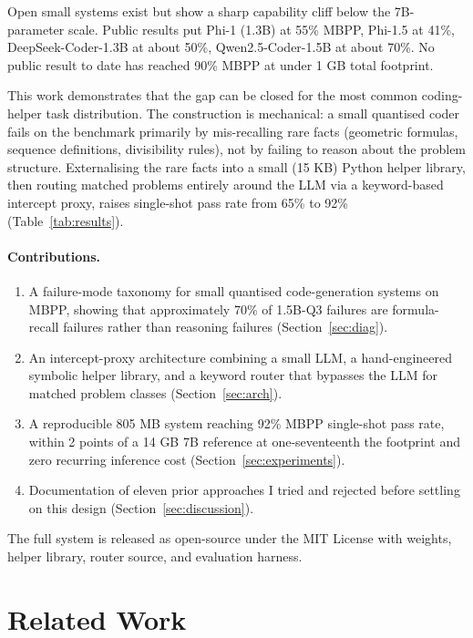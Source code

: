 \documentclass[11pt,a4paper]{article}
\begin{document}
Open small systems exist but show a sharp capability cliff below the 7B-parameter scale. Public results put Phi-1 (1.3B) at 55\% MBPP, Phi-1.5 at 41\%, DeepSeek-Coder-1.3B at about 50\%, Qwen2.5-Coder-1.5B at about 70\%. No public result to date has reached 90\% MBPP at under 1 GB total footprint.

This work demonstrates that the gap can be closed for the most common coding-helper task distribution. The construction is mechanical: a small quantised coder fails on the benchmark primarily by mis-recalling rare facts (geometric formulas, sequence definitions, divisibility rules), not by failing to reason about the problem structure. Externalising the rare facts into a small (15 KB) Python helper library, then routing matched problems entirely around the LLM via a keyword-based intercept proxy, raises single-shot pass rate from 65\% to 92\% (Table~\ref{tab:results}).

\paragraph{Contributions.}
\begin{enumerate}
\item A failure-mode taxonomy for small quantised code-generation systems on MBPP, showing that approximately 70\% of 1.5B-Q3 failures are formula-recall failures rather than reasoning failures (Section~\ref{sec:diag}).
\item An intercept-proxy architecture combining a small LLM, a hand-engineered symbolic helper library, and a keyword router that bypasses the LLM for matched problem classes (Section~\ref{sec:arch}).
\item A reproducible 805 MB system reaching 92\% MBPP single-shot pass rate, within 2 points of a 14 GB 7B reference at one-seventeenth the footprint and zero recurring inference cost (Section~\ref{sec:experiments}).
\item Documentation of eleven prior approaches I tried and rejected before settling on this design (Section~\ref{sec:discussion}).
\end{enumerate}

The full system is released as open-source under the MIT License with weights, helper library, router source, and evaluation harness.

\section{Related Work}
\end{document}
